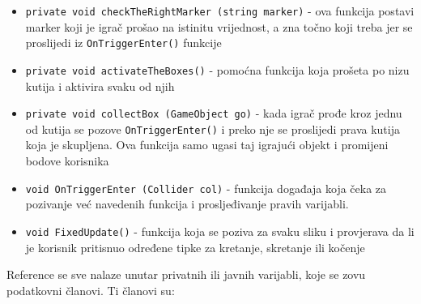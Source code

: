\begin{itemize}
	\item \texttt{private void checkTheRightMarker (string marker)} - ova funkcija postavi marker koji je igrač prošao na istinitu vrijednost, a zna točno koji treba jer se proslijedi iz \texttt{OnTriggerEnter()} funkcije
	\item \texttt{private void activateTheBoxes()} - pomoćna funkcija koja prošeta po nizu kutija i aktivira svaku od njih
	\item \texttt{private void collectBox (GameObject go)} - kada igrač prođe kroz jednu od kutija se pozove \texttt{OnTriggerEnter()} i preko nje se proslijedi prava kutija koja je skupljena. Ova funkcija samo ugasi taj igrajući objekt i promijeni bodove korisnika
	\item \texttt{void OnTriggerEnter (Collider col)} - funkcija događaja koja čeka za pozivanje već navedenih funkcija i prosljeđivanje pravih varijabli.
	\item \texttt{void FixedUpdate()} - funkcija koja se poziva za svaku sliku i provjerava da li je korisnik pritisnuo određene tipke za kretanje, skretanje ili kočenje
\end{itemize}
Reference se sve nalaze unutar privatnih ili javnih varijabli, koje se zovu podatkovni članovi. Ti članovi su:

